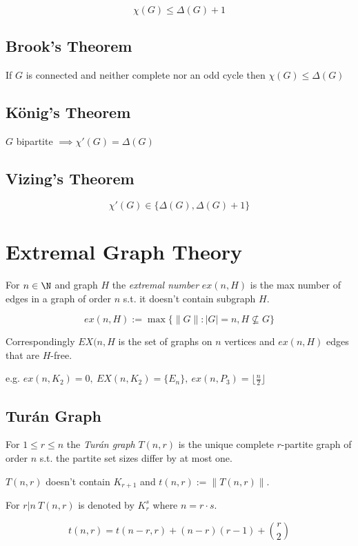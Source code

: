 $$\chi(G) \leq \Delta(G)+1$$

\subsection*{Brook's Theorem}

If $G$ is connected and neither complete nor an odd cycle then $\chi(G) \leq \Delta(G)$

\subsection*{König's Theorem}

$G$ bipartite $\implies \chi'(G) = \Delta(G)$

\subsection*{Vizing's Theorem}

$$\chi'(G) \in \{\Delta(G), \Delta(G)+1\}$$

\section*{Extremal Graph Theory}

For $n \in \N$ and graph $H$ the \emph{extremal number} $ex(n,H)$ is the max number of edges in a graph of order $n$ s.t. it doesn't contain subgraph $H$.

$$ex(n,H):=\max\{\|G\| : |G|=n, H \not\subseteq G\}$$

Correspondingly $EX(n,H$ is the set of graphs on $n$ vertices and $ex(n,H)$ edges that are $H$-free.

\spacing

e.g. $ex(n,K_2) = 0, \ EX(n,K_2) = \{E_n\}, \ ex(n,P_3)=\lfloor\frac{n}{2}\rfloor$

\subsection*{Tur\'{a}n Graph}

For $1 \leq r \leq n$ the \emph{Tur\'{a}n graph} $T(n,r)$ is the unique complete $r$-partite graph of order $n$ s.t. the partite set sizes differ by at most one.

$T(n,r)$ doesn't contain $K_{r+1}$ and $t(n,r) := \|T(n,r)\|$.

For $r | n \ T(n,r)$ is denoted by $K_r^s$ where $n=r \cdot s$.

$$t(n,r) = t(n-r,r)+(n-r)(r-1)+{r \choose 2}$$

